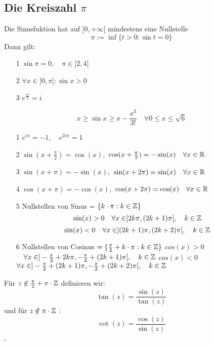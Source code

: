\subsection{Die Kreiszahl \( \pi \)}
\Satz[3.44] Die Sinusfuktion hat auf \(]0,+ \infty [\) mindestens eine Nullstelle
\[ \pi := \inf\{t > 0 : \sin t = 0\}\]
Dann gilt:
\begin{enumerate}
    \item [1] \( \sin \pi = 0,\quad \pi \in ]2,4[\)
    \item [2] \( \forall x \in ]0,\pi [: \sin x > 0\)
    \item [3] \( e^\frac{i \pi}{2} = i\)
\end{enumerate}
\Korollar[3.45]
\[ x \geq \sin x \geq x - \frac{x^3}{3!} \quad \forall 0 \leq x \leq \sqrt{6}\]
\Korollar[3.46]
\begin{enumerate}
    \item [1] \(e^{i \pi} = -1, \quad e^{2 i \pi} = 1\)
    \item [2] \( \sin(x + \frac{\pi}{2}) = \cos(x), \) \newline \(\cos(x + \frac{\pi}{2}) = -  \sin(x) \quad \forall x \in \mathbb{R}\)
    \item [3] \( \sin(x + \pi ) = - \sin(x), \) \newline \( \sin(x + 2 \pi) =  \sin(x) \quad \forall x \in \mathbb{R} \)
    \item [4] \( \cos (x + \pi) = - \cos(x), \) \newline \(\cos(x + 2 \pi) = \cos(x) \quad \forall x \in \mathbb{R} \)
    \item [5] Nullstellen von Sinus = \(\{ k \cdot \pi : k \in \mathbb{Z}\}\)
    \[ \sin(x) > 0 \quad \forall x \in ]2k \pi, (2k + 1) \pi [ ,\quad k \in \mathbb{Z}\]
    \[ \sin(x) < 0 \quad \forall x \in ](2k+1) \pi, (2k + 2) \pi [, \quad k \in \mathbb{Z}\]
    \item [6] Nullstellen von Cosinus \(= \{ \frac{\pi}{2} + k \cdot \pi : k \in \mathbb{Z} \}\)
    \( cos(x) > 0 \) \newline \(\quad \forall x \in ] -\frac{\pi}{2} + 2k \pi, -\frac{\pi}{2} + (2k+1) \pi [, \quad k \in \mathbb{Z}\)
    \( cos(x) < 0 \) \newline \(\forall x \in ] -\frac{\pi}{2} + (2k+1) \pi, -\frac{\pi}{2} + (2k + 2) \pi[,\quad k \in \mathbb{Z}\)
\end{enumerate}
Für \(z \notin \frac{\pi}{2} + \pi \cdot \mathbb{Z} \) definieren wir:
\[\tan(z) = \frac{\sin(z)}{\tan(z)}\]
und für \( z \notin \pi \cdot \mathbb{Z}\) :
\[\cot(z) = \frac{\cos(z)}{\sin(z)}\]
\sep
